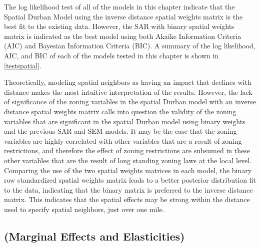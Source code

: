 The log likelihood test of all of the models in this chapter indicate that the Spatial Durban Model using the inverse distance spatial weights matrix is the best fit to the existing data.  However, the SAR with binary spatial weights matrix is indicated as the best model using both Akaike Information Criteria (AIC) and Bayesian Information Criteria (BIC).  A summary of the log likelihood, AIC, and BIC of each of the models tested in this chapter is shown in  \autoref{testspatial}.%
\begin{singlespace}
	
\end{singlespace}%
Theoretically, modeling spatial neighbors as having an impact that declines with distance makes the most intuitive interpretation of the results.  However, the lack of significance of the zoning variables in the spatial Durban model with an inverse distance spatial weights matrix calls into question the validity of the zoning variables that are significant in the spatial Durban model using binary weights and the previous SAR and SEM models.   It may be the case that the zoning variables are highly correlated with other variables that are a result of zoning restrictions, and therefore the effect of zoning restrictions are subsumed in these other variables that are the result of long standing zoning laws at the local level.  Comparing the use of the two spatial weights matrices in each model, the binary row standardized spatial weights matrix leads to a better posterior distribution fit to the data, indicating that the binary matrix is preferred to the inverse distance matrix.  This indicates that the spatial effects may be strong within the distance used to specify spatial neighbors, just over one mile.

\subsection{(Marginal Effects and Elasticities)}

